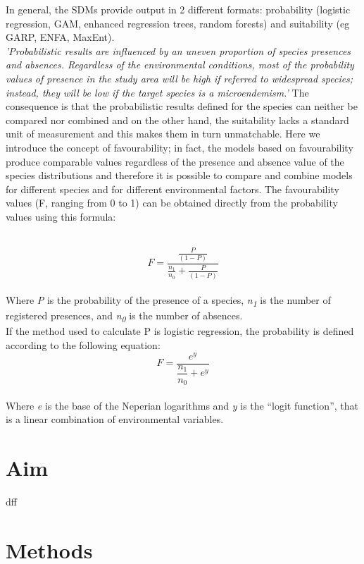 \documentclass[12pt,a4paper]{article}
\begin{document}
In general, the SDMs provide output in 2 different formats: probability (logistic regression, GAM, enhanced regression trees, random forests) and suitability (eg GARP, ENFA, MaxEnt). \\ \textit{'Probabilistic results are influenced by an uneven proportion of species presences and absences. Regardless of the environmental conditions, most of the probability values of presence in the study area will be high if referred to widespread species; instead, they will be low if the target species is a microendemism.'} \citep{fav}
The consequence is that the probabilistic results defined for the species can neither be compared nor combined and on the other hand, the suitability lacks a standard unit of measurement and this makes them in turn unmatchable.
Here we introduce the concept of favourability; in fact, the models based on favourability produce comparable values regardless of the presence and absence value of the species distributions and therefore it is possible to compare and combine models for different species and for different environmental factors.
The favourability values (F, ranging from 0 to 1) can be obtained directly from the probability values using this formula:

\\ \[ F=\dfrac{\frac{P}{(1-P)}}{\frac{n_1}{n_0}+\frac{P}{(1-P)}}\] \\

Where \textit{P} is the probability of the presence of a species, \textit{n\textsubscript{1}} is the number of registered presences, and \textit{n\textsubscript{0}} is the number of absences.\\
If the method used to calculate P is logistic regression, the probability is defined according to the following equation:
\\ \[    F=\dfrac{e^y}{\dfrac{n_1}{n_0}+{e^y}}          \] \\
Where \textit{e} is the base of the Neperian logarithms and \textit{y} is the “logit function”, that is a linear combination of environmental variables.


\newpage
\section{Aim}
dff

\newpage
\section{Methods}
\end{document}
